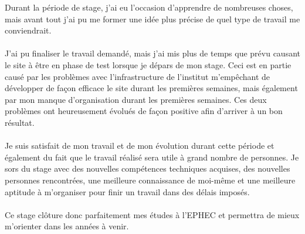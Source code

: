 \documentclass[11pt]{article}
\begin{document}
Durant la période de stage, j'ai eu l'occasion d'apprendre de nombreuses choses, mais avant tout j'ai pu me former une idée plus précise de quel type de travail me conviendrait.\\
\\
J'ai pu finaliser le travail demandé, mais j'ai mis plus de temps que prévu causant le site à être en phase de test lorsque je dépars de mon stage.
Ceci est en partie causé par les problèmes avec l'infrastructure de l'institut m'empêchant de développer de façon efficace le site durant les premières semaines, mais également par mon manque d'organisation durant les premières semaines.
Ces deux problèmes ont heureusement évolués de façon positive afin d'arriver à un bon résultat.\\
\\
Je suis satisfait de mon travail et de mon évolution durant cette période et également du fait que le travail réalisé sera utile à grand nombre de personnes.
Je sors du stage avec des nouvelles compétences techniques acquises, des nouvelles personnes rencontrées, une meilleure connaissance de moi-même et une meilleure aptitude à m'organiser pour finir un travail dans des délais imposés.\\
\\
Ce stage clôture donc parfaitement mes études à l'EPHEC et permettra de mieux m'orienter dans les années à venir.
\end{document}
